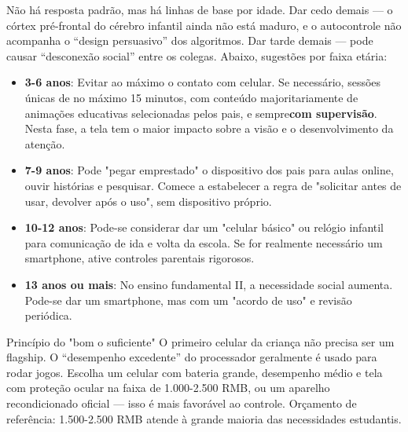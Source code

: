 


Não há resposta padrão, mas há linhas de base por idade. Dar cedo demais — o córtex pré-frontal do cérebro infantil ainda não está maduro, e o autocontrole não acompanha o “design persuasivo” dos algoritmos. Dar tarde demais — pode causar “desconexão social” entre os colegas. Abaixo, sugestões por faixa etária:

\begin{itemize}
  \item \textbf{3-6 anos}: Evitar ao máximo o contato com celular. Se necessário, sessões únicas de no máximo 15 minutos, com conteúdo majoritariamente de animações educativas selecionadas pelos pais, e sempre\textbf{com supervisão}. Nesta fase, a tela tem o maior impacto sobre a visão e o desenvolvimento da atenção.
  \item \textbf{7-9 anos}: Pode "pegar emprestado" o dispositivo dos pais para aulas online, ouvir histórias e pesquisar. Comece a estabelecer a regra de "solicitar antes de usar, devolver após o uso", sem dispositivo próprio.
  \item \textbf{10-12 anos}: Pode-se considerar dar um "celular básico" ou relógio infantil para comunicação de ida e volta da escola. Se for realmente necessário um smartphone, ative controles parentais rigorosos.
  \item \textbf{13 anos ou mais}: No ensino fundamental II, a necessidade social aumenta. Pode-se dar um smartphone, mas com um "acordo de uso" e revisão periódica.
\end{itemize}

\begin{tcbinfo}{Princípio do "bom o suficiente"}
O primeiro celular da criança não precisa ser um flagship. O “desempenho excedente” do processador geralmente é usado para rodar jogos. Escolha um celular com bateria grande, desempenho médio e tela com proteção ocular na faixa de 1.000-2.500 RMB, ou um aparelho recondicionado oficial — isso é mais favorável ao controle. Orçamento de referência: 1.500-2.500 RMB atende à grande maioria das necessidades estudantis.

\end{tcbinfo}

